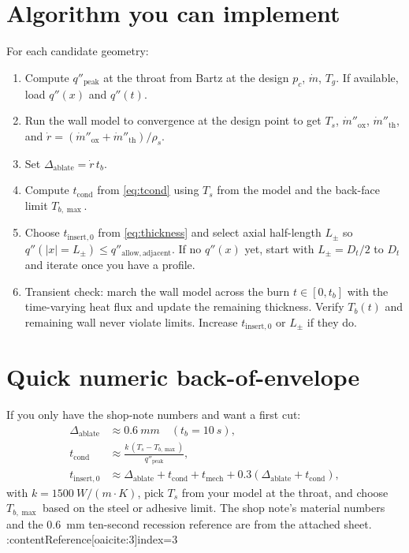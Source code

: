 \documentclass[11pt]{article}
\begin{document}
\section{Algorithm you can implement}
For each candidate geometry:
\begin{enumerate}
  \item Compute $q''_{\mathrm{peak}}$ at the throat from Bartz at the design $p_c$, $\dot m$, $T_g$. If available, load $q''(x)$ and $q''(t)$.
  \item Run the wall model to convergence at the design point to get $T_s$, $\dot m''_{\mathrm{ox}}$, $\dot m''_{\mathrm{th}}$, and $\dot r = (\dot m''_{\mathrm{ox}}+\dot m''_{\mathrm{th}})/\rho_s$.
  \item Set $\Delta_{\mathrm{ablate}} = \dot r\,t_b$.
  \item Compute $t_{\mathrm{cond}}$ from \eqref{eq:tcond} using $T_s$ from the model and the back-face limit $T_{b,\max}$.
  \item Choose $t_{\mathrm{insert,0}}$ from \eqref{eq:thickness} and select axial half-length $L_\pm$ so $q''(|x|=L_\pm)\le q''_{\mathrm{allow,adjacent}}$. If no $q''(x)$ yet, start with $L_\pm=D_t/2$ to $D_t$ and iterate once you have a profile.
  \item Transient check: march the wall model across the burn $t\in [0,t_b]$ with the time-varying heat flux and update the remaining thickness. Verify $T_b(t)$ and remaining wall never violate limits. Increase $t_{\mathrm{insert,0}}$ or $L_\pm$ if they do.
\end{enumerate}

\section{Quick numeric back-of-envelope}
If you only have the shop-note numbers and want a first cut:
\begin{align*}
  \Delta_{\mathrm{ablate}} &\approx \SI{0.6}{mm}\quad (t_b=\SI{10}{s}), \\
  t_{\mathrm{cond}} &\approx \frac{k\,(T_s - T_{b,\max})}{q''_{\mathrm{peak}}}, \\
  t_{\mathrm{insert,0}} &\approx \Delta_{\mathrm{ablate}} + t_{\mathrm{cond}} + t_{\mathrm{mech}} + 0.3\left(\Delta_{\mathrm{ablate}} + t_{\mathrm{cond}}\right),
\end{align*}
with $k=\SI{1500}{W/(m\cdot K)}$, pick $T_s$ from your model at the throat, and choose $T_{b,\max}$ based on the steel or adhesive limit. The shop note’s material numbers and the \SI{0.6}{mm} ten-second recession reference are from the attached sheet. :contentReference[oaicite:3]{index=3}
\end{document}
